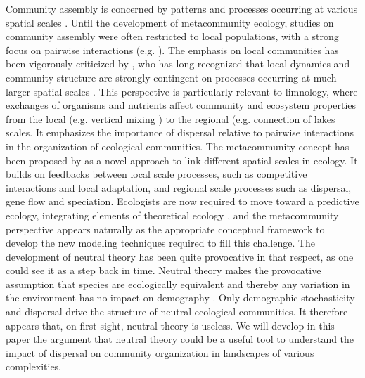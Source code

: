 \documentclass[12pt]{article}
\begin{document}
Community assembly is concerned by patterns and processes occurring at various
spatial scales \parencite{Levin1992}. Until the development of metacommunity
ecology, studies on community assembly were often restricted to local
populations, with a strong focus on pairwise interactions (e.g.
\textcite{MacArthur1972, May1973,Pimm1982,DeAngelis1992}). The emphasis on local
communities has been vigorously criticized by \textcite{Ricklefs2008}, who has
long recognized that local dynamics and community structure are strongly
contingent on processes occurring at much larger spatial scales
\parencite{Ricklefs1987}. This perspective is particularly relevant to
limnology, where exchanges of organisms and nutrients affect community and
ecosystem properties from the local (e.g. vertical mixing
\parencite{Ryabov2011}) to the regional (e.g. connection of lakes
\parencite{Leibold2004b} scales. It emphasizes the importance of dispersal
relative to pairwise interactions in the organization of ecological communities.
The metacommunity concept has been proposed by \textcite{Leibold2004a} as a
novel approach to link different spatial scales in ecology. It builds on
feedbacks between local scale processes, such as competitive interactions and
local adaptation, and regional scale processes such as dispersal, gene flow and
speciation. Ecologists are now required to move toward a predictive ecology,
integrating elements of theoretical ecology \parencite{Thuiller2013}, and the
metacommunity perspective appears naturally as the appropriate conceptual
framework to develop the new modeling techniques required to fill this
challenge. The development of neutral theory has been quite provocative in that
respect, as one could see it as a step back in time. Neutral theory makes the
provocative assumption that species are ecologically equivalent and thereby any
variation in the environment has no impact on demography
\parencite{Bell2000,Hubbell2001}. Only demographic stochasticity and dispersal
drive the structure of neutral ecological communities. It therefore appears
that, on first sight, neutral theory is useless.  We will develop in this paper
the argument that neutral theory could be a useful tool to understand the impact
of dispersal on community organization in landscapes of various complexities. 
\end{document}
